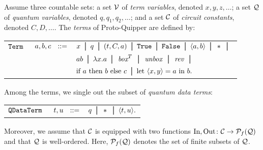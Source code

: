 \documentclass[twoside]{article}
\begin{document}
\begin{definition}
  Assume three countable sets: a set $\mathcal{V}$ of \emph{term variables},
  denoted $x,y,z,\ldots$; a set $\mathcal{Q}$ of \emph{quantum variables},
  denoted $q,q_1,q_2,\ldots$; and a set $\mathcal{C}$ of \emph{circuit
    constants}, denoted $C,D,\ldots$. The \emph{terms} of
  Proto-Quipper are defined by:
\begin{center}
\begin{tabular}{rrl}
$\texttt{Term}$&$~a,b,c~~ ::=$ & $x \bor q \bor (t,C,a) \bor \true 
  \bor \false \bor \p{a,b} \bor * \bor$ \\[0.05in]
& & $ab \bor \lambda x.a \bor \boxx^T \bor \unbox \bor \rev 
    \bor $\\[0.05in]
& & $\ifthenelse{a}{b}{c} \bor \letin{\p{x,y}}{a}{b}.$
\end{tabular}
\end{center}
Among the terms, we single out the subset of \emph{quantum data terms}:
\begin{center}
\begin{tabular}{rrl}
$\texttt{QDataTerm}$&$~t,u~~::=$ & $q \bor * \bor \p{t,u}.$
\end{tabular}
\end{center}
Moreover, we assume that $\mathcal{C}$ is equipped with two functions 
$\mathop{\textrm{In}}\nolimits,\mathop{\textrm{Out}}\nolimits\colon \mathcal{C}\to\mathcal{P}_f(\mathcal{Q})$ and that $\mathcal{Q}$ is 
well-ordered. Here, $\mathcal{P}_f(\mathcal{Q})$ denotes the set of finite subsets
of $\mathcal{Q}$.
\end{definition}
\end{document}
